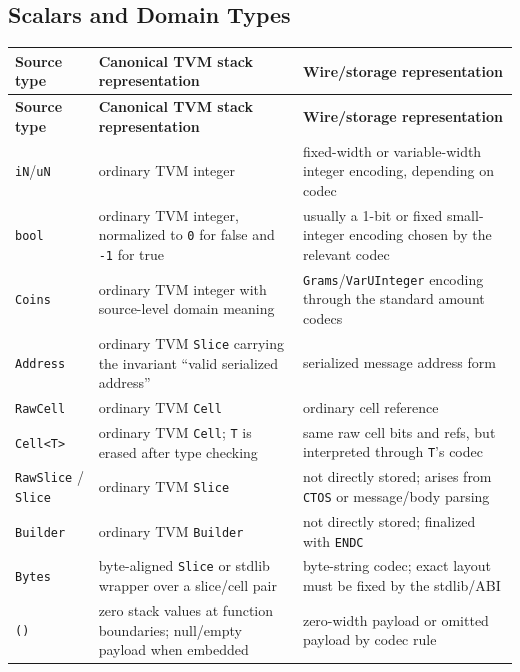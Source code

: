\documentclass[12pt,oneside]{article}
\begin{document}
\subsection{Scalars and Domain Types}
\begin{longtable}{|L{0.24\textwidth}|L{0.30\textwidth}|L{0.32\textwidth}|}
\hline
\textbf{Source type} & \textbf{Canonical TVM stack representation} & \textbf{Wire/storage representation} \\ \hline
\endfirsthead
\hline
\textbf{Source type} & \textbf{Canonical TVM stack representation} & \textbf{Wire/storage representation} \\ \hline
\endhead
\texttt{iN}/\texttt{uN} &
ordinary TVM integer &
fixed-width or variable-width integer encoding, depending on codec \\ \hline
\texttt{bool} &
ordinary TVM integer, normalized to \texttt{0} for false and \texttt{-1} for true &
usually a 1-bit or fixed small-integer encoding chosen by the relevant codec \\ \hline
\texttt{Coins} &
ordinary TVM integer with source-level domain meaning &
\texttt{Grams}/\texttt{VarUInteger} encoding through the standard amount codecs \\ \hline
\texttt{Address} &
ordinary TVM \texttt{Slice} carrying the invariant ``valid serialized address'' &
serialized message address form \\ \hline
\texttt{RawCell} &
ordinary TVM \texttt{Cell} &
ordinary cell reference \\ \hline
\texttt{Cell<T>} &
ordinary TVM \texttt{Cell}; \texttt{T} is erased after type checking &
same raw cell bits and refs, but interpreted through \texttt{T}'s codec \\ \hline
\texttt{RawSlice} / \texttt{Slice} &
ordinary TVM \texttt{Slice} &
not directly stored; arises from \texttt{CTOS} or message/body parsing \\ \hline
\texttt{Builder} &
ordinary TVM \texttt{Builder} &
not directly stored; finalized with \texttt{ENDC} \\ \hline
\texttt{Bytes} &
byte-aligned \texttt{Slice} or stdlib wrapper over a slice/cell pair &
byte-string codec; exact layout must be fixed by the stdlib/ABI \\ \hline
\texttt{()} &
zero stack values at function boundaries; null/empty payload when embedded &
zero-width payload or omitted payload by codec rule \\ \hline
\end{longtable}
\end{document}
